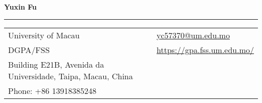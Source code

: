 \documentclass[letterpaper,11pt,oneside]{article}
\begin{document}

\noindent  \LARGE{\textbf{Yuxin Fu}} \\
\vspace{-2ex} 
\hrule 
\normalsize


\begin{center}
\begin{tabular}{l l}
 University of Macau    & \hspace{0.2in} \href{mailto:yc57370@um.edu.mo}{yc57370@um.edu.mo} \\
 DGPA/FSS    & \hspace{0.2in}  \href{https://gpa.fss.um.edu.mo/}{https://gpa.fss.um.edu.mo/}   \\
 Building E21B, Avenida da Universidade, Taipa, Macau, China    \\
 Phone: +86 13918385248 \\
\end{tabular}
\end{center}

\vspace{1em}

\end{document}
